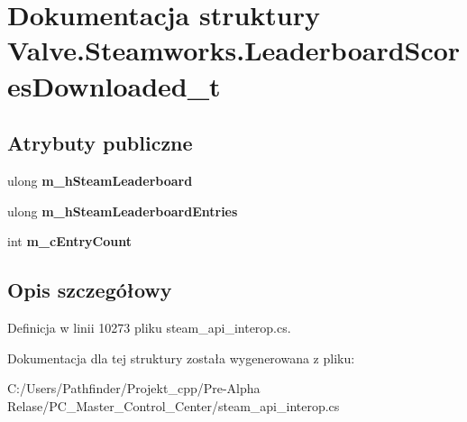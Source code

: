\hypertarget{struct_valve_1_1_steamworks_1_1_leaderboard_scores_downloaded__t}{}\section{Dokumentacja struktury Valve.\+Steamworks.\+Leaderboard\+Scores\+Downloaded\+\_\+t}
\label{struct_valve_1_1_steamworks_1_1_leaderboard_scores_downloaded__t}
\subsection*{Atrybuty publiczne}
\begin{DoxyCompactItemize}
\item 
\mbox{\label{struct_valve_1_1_steamworks_1_1_leaderboard_scores_downloaded__t_ad2588d13b29304624be4d3b2fb3b1645}} 
ulong {\bfseries m\+\_\+h\+Steam\+Leaderboard}
\item 
\mbox{\label{struct_valve_1_1_steamworks_1_1_leaderboard_scores_downloaded__t_a8f3e9981caa5ea2cbfd4187ae6e2d087}} 
ulong {\bfseries m\+\_\+h\+Steam\+Leaderboard\+Entries}
\item 
\mbox{\label{struct_valve_1_1_steamworks_1_1_leaderboard_scores_downloaded__t_aafa5571b715d2babfefbad0af9d9a611}} 
int {\bfseries m\+\_\+c\+Entry\+Count}
\end{DoxyCompactItemize}


\subsection{Opis szczegółowy}


Definicja w linii 10273 pliku steam\+\_\+api\+\_\+interop.\+cs.



Dokumentacja dla tej struktury została wygenerowana z pliku\+:\begin{DoxyCompactItemize}
\item 
C\+:/\+Users/\+Pathfinder/\+Projekt\+\_\+cpp/\+Pre-\/\+Alpha Relase/\+P\+C\+\_\+\+Master\+\_\+\+Control\+\_\+\+Center/steam\+\_\+api\+\_\+interop.\+cs\end{DoxyCompactItemize}
